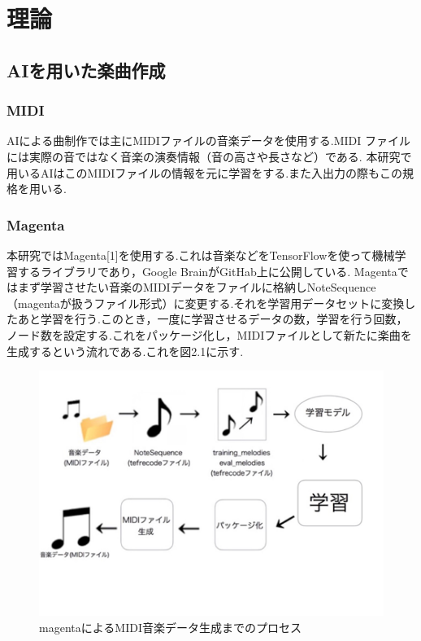 \chapter{理論}
\section{AIを用いた楽曲作成}
\subsection{MIDI}
AIによる曲制作では主にMIDIファイルの音楽データを使用する.MIDI ファイルには実際の音ではなく音楽の演奏情報（音の高さや長さなど）である.
本研究で用いるAIはこのMIDIファイルの情報を元に学習をする.また入出力の際もこの規格を用いる.
\subsection{Magenta}
本研究ではMagenta[1]を使用する.これは音楽などをTensorFlowを使って機械学習するライブラリであり，Google BrainがGitHab上に公開している.
Magentaではまず学習させたい音楽のMIDIデータをファイルに格納しNoteSequence（magentaが扱うファイル形式）に変更する.それを学習用データセットに変換したあと学習を行う.このとき，一度に学習させるデータの数，学習を行う回数，ノード数を設定する.これをパッケージ化し，MIDIファイルとして新たに楽曲を生成するという流れである.これを図2.1に示す.\\
\begin{figure}[!ht]
    \begin{screen}
    \begin{center}
        \includegraphics[scale=1.5, clip]{./img/magenta_usestep.png}
        \caption{magentaによるMIDI音楽データ生成までのプロセス}
        \label{fig:magentaによるMIDI音楽データ生成までのプロセス}
    \end{center}
    \end{screen}
\end{figure}\\
